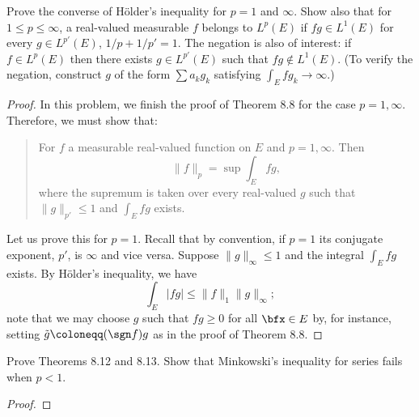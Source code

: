 
\begin{problem}
Prove the converse of Hölder's inequality for $p=1$ and $\infty$. Show also
that for $1\leq p\leq\infty$, a real-valued measurable $f$ belongs to
$L^p(E)$ if $fg\in L^1(E)$ for every $g\in L^{p'}(E)$, $1/p+1/p'=1$. The
negation is also of interest: if $f\in L^p(E)$ then there exists $g\in
L^{p'}(E)$ such that $fg\notin L^1(E)$. (To verify the negation, construct
$g$ of the form $\sum a_kg_k$ satisfying $\int_E fg_k\to\infty$.)
\end{problem}
\begin{proof}
In this problem, we finish the proof of Theorem 8.8 for the case
$p=1,\infty$. Therefore, we must show that:
\begin{quote}
For $f$ a measurable real-valued function on $E$ and $p=1,\infty$. Then
\[
\|f\|_p=\sup\int_E fg,
\]
where the supremum is taken over every real-valued $g$ such that
$\|g\|_{p'}\leq 1$ and $\int_E fg$ exists.
\end{quote}

Let us prove this for $p=1$. Recall that by convention, if $p=1$ its
conjugate exponent, $p'$, is $\infty$ and vice versa. Suppose
$\|g\|_\infty\leq 1$ and the integral $\int_E fg$ exists. By Hölder's
inequality, we have
\[
\int_E |fg|\leq \|f\|_1\|g\|_\infty;
\]
note that we may choose $g$ such that $fg\geq 0$ for all $\bfx\in E$ by,
for instance, setting $\tilde g\coloneqq (\sgn f)g$ as in the proof of
Theorem 8.8.
\end{proof}


\newpage

\begin{problem}
Prove Theorems 8.12 and 8.13. Show that Minkowski’s inequality for series
fails when $p<1$.
\end{problem}
\begin{proof}
\end{proof}
\newpage

